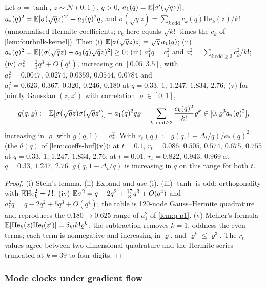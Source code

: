 \begin{lemma}[proved]\label{lem:ge-coeff-pred}
Let $\sigma=\tanh$, $z\sim\mathcal N(0,1)$, $q>0$, $a_1(q)=\mathbb{E}[\sigma'(\sqrt q z)]$, $a_*(q)^2=\mathbb{E}[\sigma(\sqrt q z)^2]-a_1(q)^2q$, and $\sigma(\sqrt qz)=\sum_{k\ \mathrm{odd}}c_k(q)\mathrm{He}_k(z)/k!$ (unnormalised Hermite coefficients; $c_k$ here equals $\sqrt{k!}$ times the $c_k$ of \cref{lem:fourbulk-kernel}). Then (i) $\mathbb{E}[\sigma(\sqrt qz)z]=\sqrt q\,a_1(q)$; (ii) $a_*(q)^2=\mathbb{E}[(\sigma(\sqrt qz)-a_1(q)\sqrt qz)^2]\ge0$; (iii) $a_1^2q=c_1^2$ and $a_*^2=\sum_{k\ \mathrm{odd}\ge3}c_k^2/k!$; (iv) $a_*^2=\tfrac23q^3+O(q^4)$, increasing on $[0.05,3.5]$, with $a_*^2=0.0047,\,0.0274,\,0.0359,\,0.0544,\,0.0784$ and $a_1^2=0.623,\,0.367,\,0.320,\,0.246,\,0.180$ at $q=0.33,\,1,\,1.247,\,1.834,\,2.76$; (v) for jointly Gaussian $(z,z')$ with correlation $\varrho\in[0,1]$,
\[ g(q,\varrho):=\E[\sigma(\sqrt qz)\sigma(\sqrt qz')]-a_1(q)^2q\varrho=\sum_{k\ \mathrm{odd}\ge3}\frac{c_k(q)^2}{k!}\varrho^k\in[0,\varrho^3a_*(q)^2], \]
increasing in $\varrho$ with $g(q,1)=a_*^2$. With $r_t(q):=g(q,1-\Delta_t/q)/a_*(q)^2$ (the $\theta(q)$ of \cref{lem:coeffs-buf}(v)): at $t=0.1$, $r_t=0.086,\,0.505,\,0.574,\,0.675,\,0.755$ at $q=0.33,\,1,\,1.247,\,1.834,\,2.76$; at $t=0.01$, $r_t=0.822,\,0.943,\,0.969$ at $q=0.33,\,1.247,\,2.76$. $g(q,1-\Delta_t/q)$ is increasing in $q$ on this range for both $t$.
\end{lemma}
\begin{proof}
(i) Stein's lemma. (ii) Expand and use (i). (iii) $\tanh$ is odd; orthogonality with $\mathbb{E}\mathrm{He}_k^2=k!$. (iv) $\mathbb{E}\sigma^2=q-2q^2+\tfrac{17}3q^3+O(q^4)$ and $a_1^2q=q-2q^2+5q^3+O(q^4)$; the table is 120-node Gauss--Hermite quadrature and reproduces the $0.180\to0.625$ range of $a_1^2$ of \cref{lem:q-p1}. (v) Mehler's formula $\mathbb{E}[\mathrm{He}_k(z)\mathrm{He}_l(z')]=\delta_{kl}k!\varrho^k$; the subtraction removes $k=1$, oddness the even terms; each term is nonnegative and increasing in $\varrho$, and $\varrho^k\le\varrho^3$. The $r_t$ values agree between two-dimensional quadrature and the Hermite series truncated at $k=39$ to four digits.
\end{proof}

\subsubsection{Mode clocks under gradient flow}

